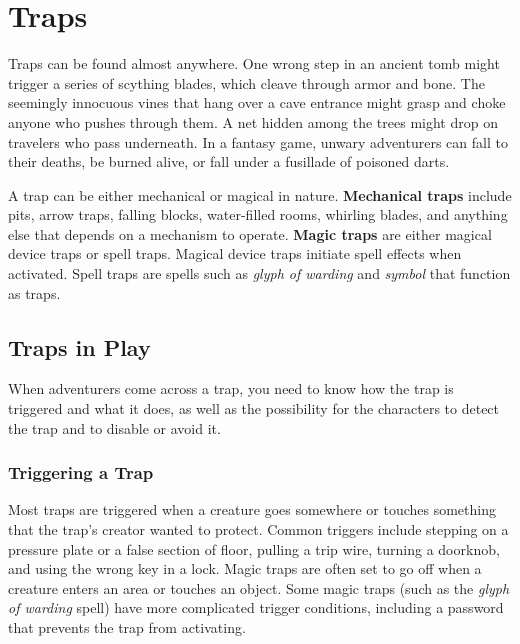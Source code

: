 \documentclass[
]{article}
\date{}
\begin{document}
\hypertarget{traps}{%
\section{Traps}\label{traps}}

Traps can be found almost anywhere. One wrong step in an ancient tomb
might trigger a series of scything blades, which cleave through armor
and bone. The seemingly innocuous vines that hang over a cave entrance
might grasp and choke anyone who pushes through them. A net hidden among
the trees might drop on travelers who pass underneath. In a fantasy
game, unwary adventurers can fall to their deaths, be burned alive, or
fall under a fusillade of poisoned darts.

A trap can be either mechanical or magical in nature. \textbf{Mechanical
traps} include pits, arrow traps, falling blocks, water-filled rooms,
whirling blades, and anything else that depends on a mechanism to
operate. \textbf{Magic traps} are either magical device traps or spell
traps. Magical device traps initiate spell effects when activated. Spell
traps are spells such as \emph{glyph of warding} and \emph{symbol} that
function as traps.

\hypertarget{traps-in-play}{%
\subsection{Traps in Play}\label{traps-in-play}}

When adventurers come across a trap, you need to know how the trap is
triggered and what it does, as well as the possibility for the
characters to detect the trap and to disable or avoid it.

\hypertarget{triggering-a-trap}{%
\subsubsection{Triggering a Trap}\label{triggering-a-trap}}

Most traps are triggered when a creature goes somewhere or touches
something that the trap's creator wanted to protect. Common triggers
include stepping on a pressure plate or a false section of floor,
pulling a trip wire, turning a doorknob, and using the wrong key in a
lock. Magic traps are often set to go off when a creature enters an area
or touches an object. Some magic traps (such as the \emph{glyph of
warding} spell) have more complicated trigger conditions, including a
password that prevents the trap from activating.
\end{document}
